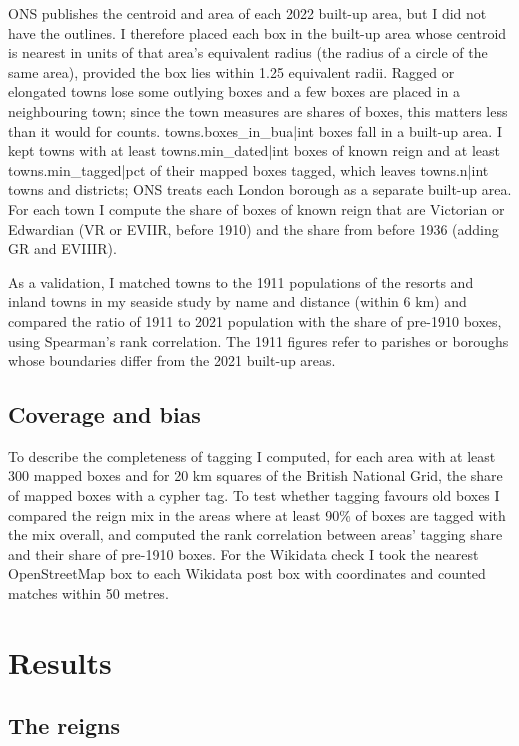 \documentclass[11pt,a4paper]{article}
\begin{document}
ONS publishes the centroid and area of each 2022 built-up area, but I did not have the outlines. I therefore placed each box in the built-up area whose centroid is nearest in units of that area's equivalent radius (the radius of a circle of the same area), provided the box lies within 1.25 equivalent radii. Ragged or elongated towns lose some outlying boxes and a few boxes are placed in a neighbouring town; since the town measures are shares of boxes, this matters less than it would for counts. {{towns.boxes_in_bua|int}} boxes fall in a built-up area. I kept towns with at least {{towns.min_dated|int}} boxes of known reign and at least {{towns.min_tagged|pct}} of their mapped boxes tagged, which leaves {{towns.n|int}} towns and districts; ONS treats each London borough as a separate built-up area. For each town I compute the share of boxes of known reign that are Victorian or Edwardian (VR or EVIIR, before 1910) and the share from before 1936 (adding GR and EVIIIR).

As a validation, I matched towns to the 1911 populations of the resorts and inland towns in my seaside study by name and distance (within 6 km) and compared the ratio of 1911 to 2021 population with the share of pre-1910 boxes, using Spearman's rank correlation. The 1911 figures refer to parishes or boroughs whose boundaries differ from the 2021 built-up areas.

\subsection{Coverage and bias}

To describe the completeness of tagging I computed, for each area with at least 300 mapped boxes and for 20 km squares of the British National Grid, the share of mapped boxes with a cypher tag. To test whether tagging favours old boxes I compared the reign mix in the areas where at least 90\% of boxes are tagged with the mix overall, and computed the rank correlation between areas' tagging share and their share of pre-1910 boxes. For the Wikidata check I took the nearest OpenStreetMap box to each Wikidata post box with coordinates and counted matches within 50 metres.

\section{Results}

\subsection{The reigns}
\end{document}
